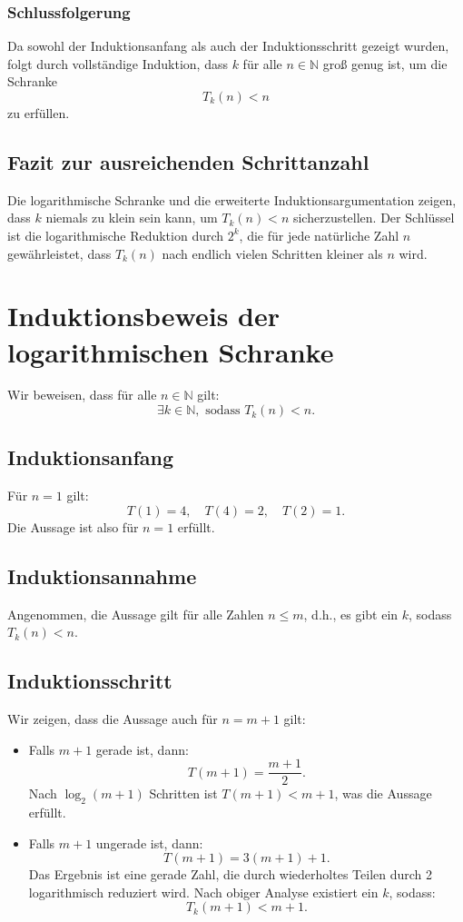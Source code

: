 \documentclass[a4paper,12pt]{article}
\begin{document}
\subsubsection{Schlussfolgerung}
Da sowohl der Induktionsanfang als auch der Induktionsschritt gezeigt wurden, folgt durch vollständige Induktion, dass \( k \) für alle \( n \in \mathbb{N} \) groß genug ist, um die Schranke
\[
T_k(n) < n
\]
zu erfüllen.

\subsection{Fazit zur ausreichenden Schrittanzahl}
Die logarithmische Schranke und die erweiterte Induktionsargumentation zeigen, dass \( k \) niemals zu klein sein kann, um \( T_k(n) < n \) sicherzustellen. Der Schlüssel ist die logarithmische Reduktion durch \( 2^k \), die für jede natürliche Zahl \( n \) gewährleistet, dass \( T_k(n) \) nach endlich vielen Schritten kleiner als \( n \) wird.

\section{Induktionsbeweis der logarithmischen Schranke}
Wir beweisen, dass für alle \( n \in \mathbb{N} \) gilt:
\[
\exists k \in \mathbb{N}, \text{ sodass } T_k(n) < n.
\]

\subsection{Induktionsanfang}
Für \( n = 1 \) gilt:
\[
T(1) = 4, \quad T(4) = 2, \quad T(2) = 1.
\]
Die Aussage ist also für \( n = 1 \) erfüllt.

\subsection{Induktionsannahme}
Angenommen, die Aussage gilt für alle Zahlen \( n \leq m \), d.h., es gibt ein \( k \), sodass \( T_k(n) < n \).

\subsection{Induktionsschritt}
Wir zeigen, dass die Aussage auch für \( n = m + 1 \) gilt:
\begin{itemize}
    \item Falls \( m + 1 \) gerade ist, dann:
    \[
    T(m + 1) = \frac{m + 1}{2}.
    \]
    Nach \( \log_2(m + 1) \) Schritten ist \( T(m + 1) < m + 1 \), was die Aussage erfüllt.
    \item Falls \( m + 1 \) ungerade ist, dann:
    \[
    T(m + 1) = 3(m + 1) + 1.
    \]
    Das Ergebnis ist eine gerade Zahl, die durch wiederholtes Teilen durch 2 logarithmisch reduziert wird. Nach obiger Analyse existiert ein \( k \), sodass:
    \[
    T_k(m + 1) < m + 1.
    \]
\end{itemize}
\end{document}
